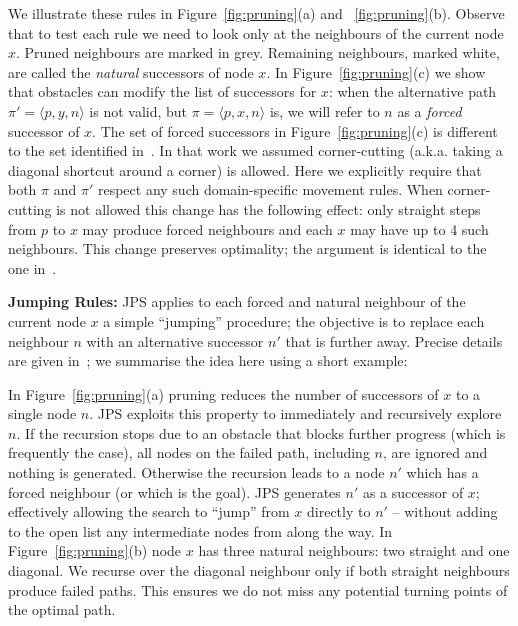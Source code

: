 We illustrate these rules in Figure~\ref{fig:pruning}(a) and ~\ref{fig:pruning}(b).
Observe that to test each rule we need to look only at
the neighbours of the current node $x$. 
Pruned neighbours are marked in grey. Remaining neighbours, marked
white, are called the \emph{natural} successors of node $x$.  
In Figure~\ref{fig:pruning}(c) we show
that obstacles can modify the list of successors for $x$:
when the alternative path $\pi' = \langle p, y, n \rangle$ is
not valid, but $\pi = \langle p, x, n \rangle$ is, we will refer to $n$ as
a \emph{forced} successor of $x$.
The set of forced successors in Figure~\ref{fig:pruning}(c) is different
to the set identified in~\cite{harabor11b}. 
In that work we assumed corner-cutting (a.k.a. taking a diagonal shortcut around a corner) is allowed.
Here we explicitly require that both $\pi$ and $\pi'$ respect 
any such domain-specific movement rules.
When corner-cutting is not allowed this change has the following effect:
only straight steps from $p$ to $x$ may produce forced neighbours and each $x$ may have 
up to 4 such neighbours.
This change preserves optimality; the argument is identical to 
the one in~\cite{harabor11b}.

\textbf{Jumping Rules:}
JPS applies to each forced and natural neighbour of the current node $x$ a simple
``jumping'' procedure; the objective is to replace each neighbour $n$ with an 
alternative successor $n'$ that is further away. Precise details are given
in~\cite{harabor11b}; we summarise the idea here using a short example:

\begin{example}
In Figure~\ref{fig:pruning}(a) pruning reduces the number
of successors of $x$ to a single node $n$.
JPS exploits this property to immediately and recursively
explore $n$.
If the recursion stops due to an obstacle that blocks further progress
(which is frequently the case), all nodes on the failed path, including $n$, are ignored
and nothing is generated.
Otherwise the recursion leads to a node $n'$ which has a forced
neighbour (or which is the goal). JPS generates $n'$ as a successor of $x$; 
effectively allowing the search to ``jump'' from $x$ directly to $n'$ -- without adding
to the open list any intermediate nodes from along the way.
In Figure~\ref{fig:pruning}(b) node $x$ has three natural neighbours: two straight and one diagonal.
We recurse over the diagonal neighbour only if both straight neighbours produce
failed paths. This ensures we do not miss any potential turning points of the optimal path.
\end{example}

